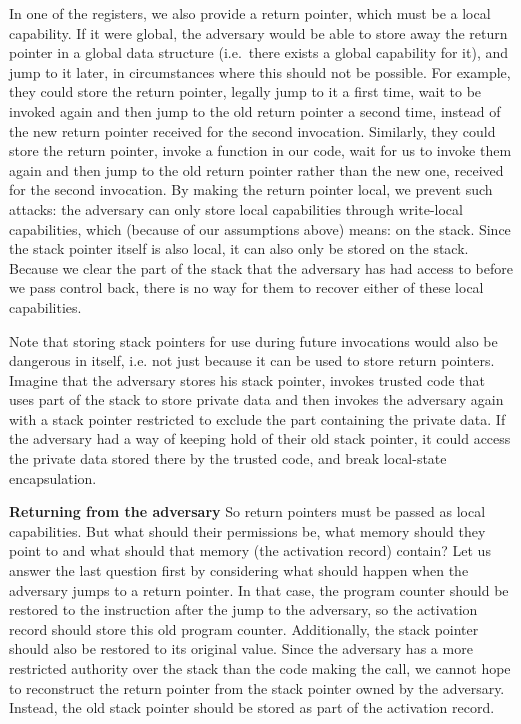 \documentclass[compsoc,conference,letterpaper,fleqn]{IEEEtran}
\newcommand\lau[1]{{\color{purple} \sf \footnotesize {LS: #1}}\\}
\renewcommand\lau[1]{}
\begin{document}
In one of the registers, we also provide a return pointer, which must be a local
capability. If it were global, the adversary would be able to store away the
return pointer in a global data structure (i.e.\ there exists a global capability for it), and jump to it later, in
circumstances where this should not be possible. For example, they could store
the return pointer, legally jump to it a first time, wait to be invoked again
and then jump to the old return pointer a second time, instead of the new return
pointer received for the second invocation. Similarly, they could store the
return pointer, invoke a function in our code, wait for us to invoke them again
and then jump to the old return pointer rather than the new one, received for the
second invocation.
%
By making the return pointer local, we prevent such attacks: the adversary can
only store local capabilities through write-local capabilities, which (because
of our assumptions above) means: on the stack. Since the stack pointer itself is
also local, it can also only be stored on the stack. Because we clear the part
of the stack that the adversary has had access to before we pass control back,
there is no way for them to recover either of these local capabilities.

Note that storing stack pointers for use during future invocations would also be
dangerous in itself, i.e. not just because it can be used to store return
pointers. Imagine that the adversary stores his stack pointer, invokes trusted
code that uses part of the stack to store private data and then invokes the
adversary again with a stack pointer restricted to exclude the part containing
the private data. If the adversary had a way of keeping hold of their old stack
pointer, it could access the private data stored there by the trusted code, and
break local-state encapsulation.

\textbf{Returning from the adversary} So return pointers must be passed as local
capabilities. But what should their permissions be, what memory should they
point to and what should that memory (the activation record) contain? Let us
answer the last question first by considering what should happen when the
adversary jumps to a return pointer. In that case, the program counter should be
restored to the instruction after the jump to the adversary, so the activation
record should store this old program counter. Additionally, the stack pointer
should also be restored to its original value. Since the adversary has a more
restricted authority over the stack than the code making the call, we cannot
hope to reconstruct the return pointer from the stack pointer owned by the
adversary. Instead, the old stack pointer should be stored as part of the
activation record.
\end{document}

